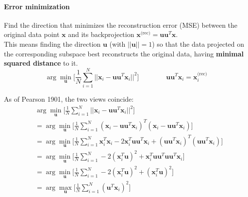 \paragraph{Error minimization} Find the direction that minimizes the reconstruction error (MSE) between the original data point $\mathbf{x}$ and its backprojection $\mathbf{x}^{\text{(rec)}} = \mathbf{u}\mathbf{u}^T\mathbf{x}$.\\
This means finding the direction $\mathbf{u}$ (with $\lvert\lvert \mathbf{u} \rvert\rvert = 1$) so that the data projected on the corresponding subspace best reconstructs the original data, having \textbf{minimal squared distance} to it.
\begin{equation}
	\arg\min_\mathbf{u}\big[\frac{1}{N}\sum_{i=1}^N \lvert\lvert \mathbf{x}_i - \mathbf{u}\mathbf{u}^T\mathbf{x}_i\rvert\rvert^2\big] \qquad\qquad \mathbf{u}\mathbf{u}^T\mathbf{x}_i = \mathbf{x}_i^{\text{(rec)}}
\end{equation}

\begin{observation}
	As of Pearson 1901, the two views coincide:
	\begin{align*}
		& \arg\min_\mathbf{u}\big[\frac{1}{N}\sum_{i=1}^N \lvert\lvert \mathbf{x}_i - \mathbf{u}\mathbf{u}^T\mathbf{x}_i\rvert\rvert^2\big]\\
		& = \arg\min_\mathbf{u}\big[\frac{1}{N}\sum_{i=1}^N (\mathbf{x}_i - \mathbf{u}\mathbf{u}^T\mathbf{x}_i)^T(\mathbf{x}_i - \mathbf{u}\mathbf{u}^T\mathbf{x}_i)\big] \\
		& = \arg\min_\mathbf{u}\big[\frac{1}{N}\sum_{i=1}^N \mathbf{x}_i^T\mathbf{x}_i - 2\mathbf{x}_i^T\mathbf{u}\mathbf{u}^T\mathbf{x}_i+(\mathbf{u}\mathbf{u}^T\mathbf{x}_i)^T(\mathbf{u}\mathbf{u}^T\mathbf{x}_i)\big] \\
		& = \arg\min_\mathbf{u}\big[\frac{1}{N}\sum_{i=1}^N -2(\mathbf{x}_i^T\mathbf{u})^2+\mathbf{x}_i^T\mathbf{u}\mathbf{u}^T\mathbf{u}\mathbf{u}^T\mathbf{x}_i\big] \\
		& = \arg\min_\mathbf{u}\big[\frac{1}{N}\sum_{i=1}^N -2(\mathbf{x}_i^T\mathbf{u})^2+(\mathbf{x}_i^T\mathbf{u})^2\big]\\
		& = \arg\max_\mathbf{u} \big[\frac{1}{N} \sum_{i=1}^N(\mathbf{u}^T\mathbf{x}_i)^2\big]
	\end{align*}
	\begin{figure}[!h]
		\hfill
		\hfill
		\hfill
	\end{figure}
\end{observation}
